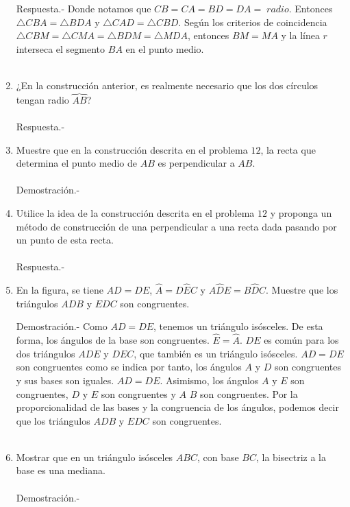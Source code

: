 \begin{enumerate}
	Respuesta.- Donde notamos que $CB = CA = BD = DA = \; radio$. Entonces $\triangle CBA = \triangle BDA$ y $\triangle CAD = \triangle CBD$. Según los criterios de coincidencia $\triangle CBM = \triangle CMA = \triangle BDM = \triangle MDA$, entonces $BM = MA$ y la línea $r$ interseca el segmento $BA$ en el punto medio.\\\\

	\item ¿En la construcción anterior, es realmente necesario que los dos círculos tengan radio $\overbrace{AB}$?\\\\
	Respuesta.-\;

	\item Muestre que en la construcción descrita en el problema $12$, la recta que determina el punto medio de $AB$ es perpendicular a $AB$.\\\\
	Demostración.-\;

	\item Utilice la idea de la construcción descrita en el problema $12$ y proponga un método de construcción de una perpendicular a una recta dada pasando por un punto de esta recta.\\\\
	Respuesta.-\;

	\item En la figura, se tiene $AD=DE$, $\widehat{A}=D\widehat{E}C$ y $A\widehat{D}E=B\widehat{D}C$. Muestre que los triángulos $ADB$ y $EDC$ son congruentes.
	
	\begin{center}
	\end{center}
	Demostración.-\; Como $AD = DE$, tenemos un triángulo isósceles. De esta forma, los ángulos de la base son congruentes. $\widehat{E} = \widehat{A}$. $DE$ es común para los dos triángulos $ADE$ y $DEC$, que también es un triángulo isósceles. $AD = DE$ son congruentes como se indica por tanto, los ángulos $A$ y $D$ son congruentes y sus bases son iguales. $AD = DE$. Asimismo, los ángulos $A$ y $E$ son congruentes, $D$ y $E$ son congruentes y $A$  $B$ son congruentes. Por la proporcionalidad de las bases y la congruencia de los ángulos, podemos decir que los triángulos $ADB$ y $EDC$ son congruentes.\\\\

	\item Mostrar que en un triángulo isósceles $ABC$, con base $BC$, la bisectriz a la base es una mediana.\\\\
	Demostración.-\;

    \end{enumerate}
